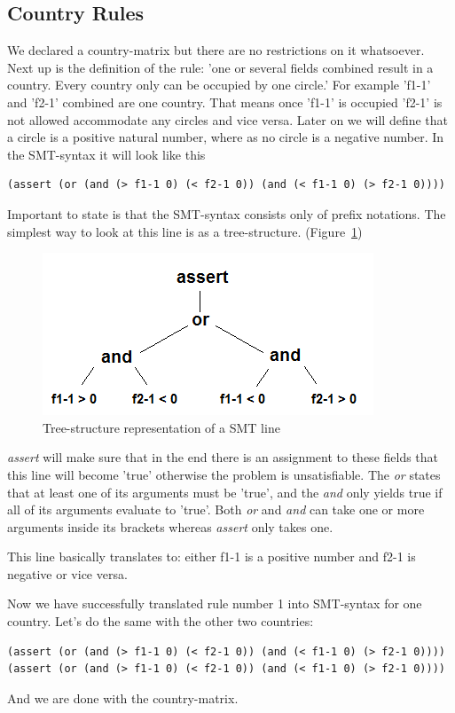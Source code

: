 \documentclass[a4paper,10pt]{paper}
\begin{document}
\subsection{Country Rules}
We declared a country-matrix but there are no restrictions on it whatsoever. Next up is the definition of the rule: 'one or several fields combined result in a country. Every country only can be occupied by one circle.'
For example 'f1-1' and 'f2-1' combined are one country. That means once 'f1-1' is occupied 'f2-1' is not allowed accommodate any circles and vice versa. Later on we will define that a circle is a positive natural number, where as no circle is a negative number. In the SMT-syntax it will look like this
\begin{lstlisting}
(assert (or (and (> f1-1 0) (< f2-1 0)) (and (< f1-1 0) (> f2-1 0))))
\end{lstlisting}
Important to state is that the SMT-syntax consists only of prefix notations. The simplest way to look at this line is as a tree-structure. (Figure~\ref{fig:tree_structure})
\begin{figure}
  \centering
  \includegraphics[scale=1]{Pictures/tree_structure.png} 
  \caption{Tree-structure representation of a SMT line}
  \label{fig:tree_structure}
\end{figure}

\emph{assert} will make sure that in the end there is an assignment to these fields that this line will become 'true' otherwise the problem is unsatisfiable. The \emph{or} states that at least one of its arguments must be 'true', and the \emph{and} only yields true if all of its arguments evaluate to 'true'. Both \emph{or} and \emph{and} can take one or more arguments inside its brackets whereas \emph{assert} only takes one.

This line basically translates to: either f1-1 is a positive number and f2-1 is negative or vice versa.

Now we have successfully translated rule number 1 into SMT-syntax for one country. Let's do the same with the other two countries:
\begin{lstlisting}
(assert (or (and (> f1-1 0) (< f2-1 0)) (and (< f1-1 0) (> f2-1 0))))
(assert (or (and (> f1-1 0) (< f2-1 0)) (and (< f1-1 0) (> f2-1 0))))
\end{lstlisting}
And we are done with the country-matrix.
\end{document}

